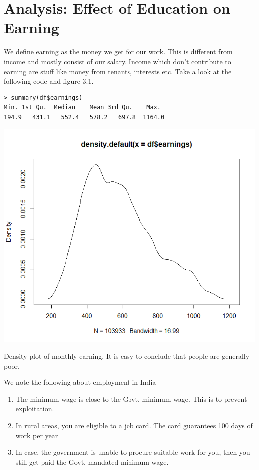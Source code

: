 \documentclass[notoc]{tufte-book}
\begin{document}
\section{Analysis: Effect of Education on Earning}
We define earning as the money we get for our work. This is different from income and mostly consist of our salary. Income which don't contribute to earning are stuff like money from tenants, interests etc. Take a look at the following code and figure 3.1.
\begin{lstlisting}
> summary(df$earnings)
Min. 1st Qu.  Median    Mean 3rd Qu.    Max. 
194.9   431.1   552.4   578.2   697.8  1164.0 
\end{lstlisting}
\begin{marginfigure}
    \includegraphics[width=\textwidth]{"c3p1.png"}
    \caption{Density plot of monthly earning. It is easy to conclude that people are generally poor.}
\end{marginfigure}
We note the following about employment in India
\begin{enumerate}
    \item The minimum wage is close to the Govt. minimum wage. This is to prevent exploitation.
    \item In rural areas, you are eligible to a job card. The card guarantees 100 days of work per year
    \item In case, the government is unable to procure suitable work for you, then you  still get paid the Govt. mandated minimum wage. 
\end{enumerate}
\end{document}
